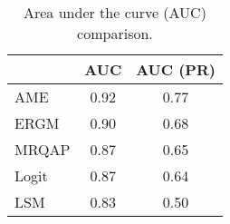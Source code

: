 \begin{table}[ht]
\centering
\begingroup\normalsize
\begin{tabular}{lcc}
  & AUC & AUC (PR) \\ 
  \hline
\hline
AME & 0.92 & 0.77 \\ 
  ERGM & 0.90 & 0.68 \\ 
  MRQAP & 0.87 & 0.65 \\ 
  Logit & 0.87 & 0.64 \\ 
  LSM & 0.83 & 0.50 \\ 
  \end{tabular}
\endgroup
\caption{Area under the curve (AUC) comparison.} 
\label{tab:aucTable}
\end{table}
